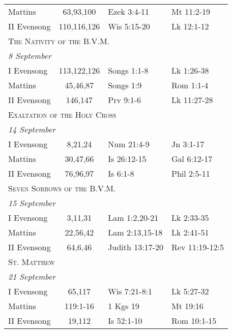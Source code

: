 \begin{longtable}{l c l l}
\hspace{1em} Mattins&63,93,100&Ezek 3:4-11&Mt 11:2-19\\
\hspace{1em} II Evensong&110,116,126&Wis 5:15-20&Lk 12:1-12\\
%
\multicolumn{4}{l}{\textsc{The Nativity of the B.V.M.}}\\
\multicolumn{4}{l}{\textit{8 September}}\\
\hspace{1em} I Evensong&113,122,126&Songs 1:1-8&Lk 1:26-38\\
\hspace{1em} Mattins&45,46,87&Songs 1:9&Rom 1:1-4\\
\hspace{1em} II Evensong&146,147&Prv 9:1-6&Lk 11:27-28\\
%
\multicolumn{4}{l}{\textsc{Exaltation of the Holy Cross}}\\
\multicolumn{4}{l}{\textit{14 September}}\\
\hspace{1em} I Evensong&8,21,24&Num 21:4-9&Jn 3:1-17\\
\hspace{1em} Mattins&30,47,66&Is 26:12-15&Gal 6:12-17\\
\hspace{1em} II Evensong&76,96,97&Is 6:1-8&Phil 2:5-11\\
%
\multicolumn{4}{l}{\textsc{Seven Sorrows of the B.V.M.}}\\
\multicolumn{4}{l}{\textit{15 September}}\\
\hspace{1em} I Evensong&3,11,31&Lam 1:2,20-21&Lk 2:33-35\\
\hspace{1em} Mattins&22,56,42&Lam 2:13,15-18&Lk 2:41-51\\
\hspace{1em} II Evensong&64,6,46&Judith 13:17-20&Rev 11:19-12:5\\
\multicolumn{4}{l}{\textsc{St. Matthew}}\\
\multicolumn{4}{l}{\textit{21 September}}\\
\hspace{1em} I Evensong&65,117&Wis 7:21-8:1&Lk 5:27-32\\
\hspace{1em} Mattins&119:1-16&1 Kgs 19&Mt 19:16\\
\hspace{1em} II Evensong&19,112&Is 52:1-10&Rom 10:1-15\\

\end{longtable}
